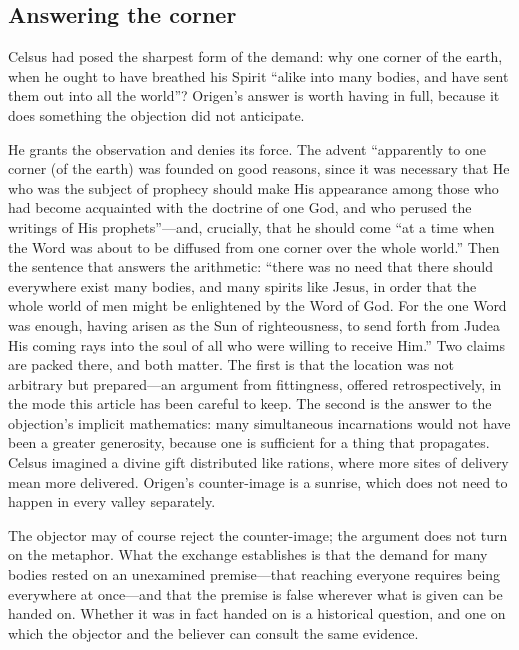 \subsection{Answering the corner}

Celsus had posed the sharpest form of the demand: why one corner of the earth, when he ought to have breathed his Spirit ``alike into many bodies, and have sent them out into all the world''? Origen's answer is worth having in full, because it does something the objection did not anticipate.

He grants the observation and denies its force. The advent ``apparently to one corner (of the earth) was founded on good reasons, since it was necessary that He who was the subject of prophecy should make His appearance among those who had become acquainted with the doctrine of one God, and who perused the writings of His prophets''---and, crucially, that he should come ``at a time when the Word was about to be diffused from one corner over the whole world.'' Then the sentence that answers the arithmetic: ``there was no need that there should everywhere exist many bodies, and many spirits like Jesus, in order that the whole world of men might be enlightened by the Word of God. For the one Word was enough, having arisen as the Sun of righteousness, to send forth from Judea His coming rays into the soul of all who were willing to receive Him.'' Two claims are packed there, and both matter. The first is that the location was not arbitrary but prepared---an argument from fittingness, offered retrospectively, in the mode this article has been careful to keep. The second is the answer to the objection's implicit mathematics: many simultaneous incarnations would not have been a greater generosity, because one is sufficient for a thing that propagates. Celsus imagined a divine gift distributed like rations, where more sites of delivery mean more delivered. Origen's counter-image is a sunrise, which does not need to happen in every valley separately.

The objector may of course reject the counter-image; the argument does not turn on the metaphor. What the exchange establishes is that the demand for many bodies rested on an unexamined premise---that reaching everyone requires being everywhere at once---and that the premise is false wherever what is given can be handed on. Whether it was in fact handed on is a historical question, and one on which the objector and the believer can consult the same evidence.

